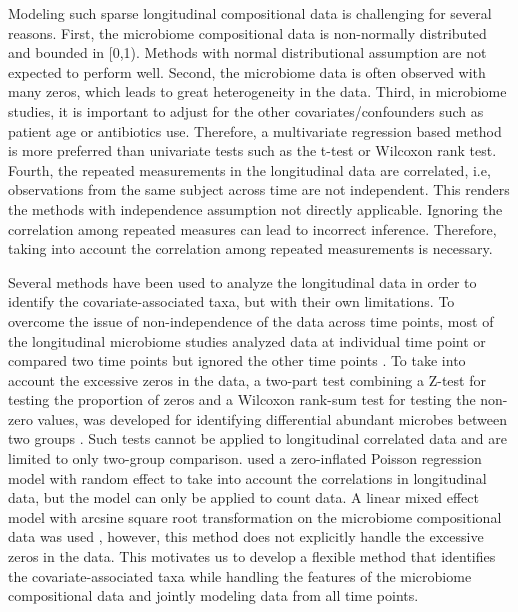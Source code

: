 Modeling such sparse longitudinal compositional data is challenging for several reasons. First, the microbiome compositional data is non-normally distributed and bounded in [0,1). Methods with normal distributional assumption are not expected to perform well. Second, the microbiome data is often observed with many zeros, which leads to great heterogeneity in the data. Third, in microbiome studies, it is important to adjust for the other covariates/confounders such as patient age or antibiotics use. Therefore, a multivariate regression based method is more preferred than univariate tests such as the t-test or Wilcoxon rank test. Fourth, the repeated measurements in the longitudinal data are correlated, i.e, observations from the same subject across time are not independent. This renders the methods with independence assumption not directly applicable. Ignoring the correlation among repeated measures can lead to incorrect inference. Therefore, taking into account the correlation among repeated measurements is necessary. 


Several methods have been used to analyze the longitudinal data in order to identify the covariate-associated taxa, but with their own limitations. To overcome the issue of non-independence of the data across time points, most of the longitudinal microbiome studies analyzed data at individual time point \citep{Cox:2014hy, arrieta2015early, Rutten:2015bx, Zhou:2015kw, David:2014cl, Schulz:2014fy} or compared two time points but ignored the other time points \citep{Backhed:2015kc, Koren:2012ji}. To take into account the excessive zeros in the data, a two-part test combining a Z-test for testing the proportion of zeros and a Wilcoxon rank-sum test for testing the non-zero values, was developed for identifying differential abundant microbes between two groups \citep{wagner2011application, markle2013sex}. Such tests cannot be applied to longitudinal correlated data and are limited to only two-group comparison. \citet{Romero:2014il} used a zero-inflated Poisson regression model with random effect to take into account the correlations in longitudinal data, but the model can only be applied to count data. A linear mixed effect model with arcsine square root transformation on the microbiome compositional data was used \citep{LaRosa:2014kk, Kostic:2015bh}, however, this method does not explicitly handle the excessive zeros in the data. This motivates us to develop a flexible method that identifies the covariate-associated taxa while handling the features of the microbiome compositional data and jointly modeling data from all time points. 


